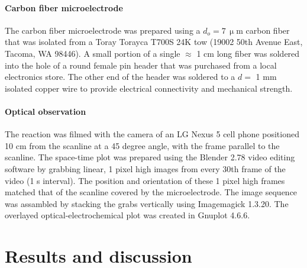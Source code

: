 \documentclass[3p, twocolumn]{elsarticle}
\begin{document}
\paragraph{Carbon fiber microelectrode} The carbon fiber microelectrode was prepared using a $d_o = 7\, \upmu$m carbon fiber that was isolated from a Toray Torayca T700S 24K tow (19002 50th Avenue East, Tacoma, WA 98446).
A small portion of a single $\approx$ 1 cm long fiber was soldered into the hole of a round female pin header that was purchased from a local electronics store. 
The other end of the header was soldered to a $d = $ 1 mm isolated copper wire to provide electrical connectivity and mechanical strength. 

\paragraph{Optical observation}
The reaction was filmed with the camera of an LG Nexus 5 cell phone positioned 10 cm from the scanline at a 45 degree angle, with the frame parallel to the scanline.
The space-time plot was prepared using the Blender 2.78 video editing software by grabbing linear, 1 pixel high images from every 30th frame of the video (1 s interval).
The position and orientation of these 1 pixel high frames matched that of the scanline covered by the microelectrode.
The image sequence was assambled by stacking the grabs vertically using Imagemagick 1.3.20.
The overlayed optical-electrochemical plot was created in Gnuplot 4.6.6.



\section{Results and discussion}
\end{document}
